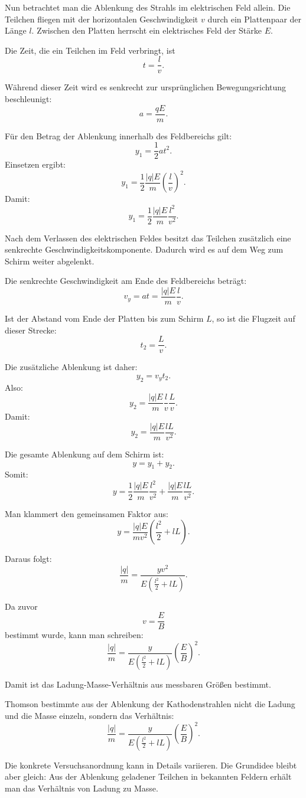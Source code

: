 Nun betrachtet man die Ablenkung des Strahls im elektrischen Feld allein. Die Teilchen
fliegen mit der horizontalen Geschwindigkeit \(v\) durch ein Plattenpaar der Länge
\(l\). Zwischen den Platten herrscht ein elektrisches Feld der Stärke \(E\).

Die Zeit, die ein Teilchen im Feld verbringt, ist
\[
t = \frac{l}{v}.
\]

Während dieser Zeit wird es senkrecht zur ursprünglichen Bewegungsrichtung beschleunigt:
\[
a = \frac{qE}{m}.
\]

Für den Betrag der Ablenkung innerhalb des Feldbereichs gilt:
\[
y_1 = \frac{1}{2} a t^2.
\]
Einsetzen ergibt:
\[
y_1
=
\frac{1}{2}
\frac{|q|E}{m}
\left(\frac{l}{v}\right)^2.
\]
Damit:
\[
y_1
=
\frac{1}{2}
\frac{|q|E}{m}
\frac{l^2}{v^2}.
\]

Nach dem Verlassen des elektrischen Feldes besitzt das Teilchen zusätzlich eine
senkrechte Geschwindigkeitskomponente. Dadurch wird es auf dem Weg zum Schirm weiter
abgelenkt.

Die senkrechte Geschwindigkeit am Ende des Feldbereichs beträgt:
\[
v_y = at
=
\frac{|q|E}{m}\frac{l}{v}.
\]

Ist der Abstand vom Ende der Platten bis zum Schirm \(L\), so ist die Flugzeit auf
dieser Strecke:
\[
t_2 = \frac{L}{v}.
\]

Die zusätzliche Ablenkung ist daher:
\[
y_2 = v_y t_2.
\]
Also:
\[
y_2
=
\frac{|q|E}{m}
\frac{l}{v}
\frac{L}{v}.
\]
Damit:
\[
y_2
=
\frac{|q|E}{m}
\frac{lL}{v^2}.
\]

Die gesamte Ablenkung auf dem Schirm ist:
\[
y = y_1 + y_2.
\]
Somit:
\[
y
=
\frac{1}{2}
\frac{|q|E}{m}
\frac{l^2}{v^2}
+
\frac{|q|E}{m}
\frac{lL}{v^2}.
\]

Man klammert den gemeinsamen Faktor aus:
\[
y
=
\frac{|q|E}{m v^2}
\left(
\frac{l^2}{2} + lL
\right).
\]

Daraus folgt:
\[
\frac{|q|}{m}
=
\frac{y v^2}
{
	E\left(\frac{l^2}{2} + lL\right)
}.
\]

Da zuvor
\[
v = \frac{E}{B}
\]
bestimmt wurde, kann man schreiben:
\[
\frac{|q|}{m}
=
\frac{y}{E\left(\frac{l^2}{2} + lL\right)}
\left(\frac{E}{B}\right)^2.
\]

Damit ist das Ladung-Masse-Verhältnis aus messbaren Größen bestimmt.

\begin{MathBox}
	\label{box:thomson-ladung-masse-verhaeltnis}
	Thomson bestimmte aus der Ablenkung der Kathodenstrahlen nicht die Ladung und
	die Masse einzeln, sondern das Verhältnis:
	\[
	\frac{|q|}{m}
	=
	\frac{y}{E\left(\frac{l^2}{2} + lL\right)}
	\left(\frac{E}{B}\right)^2.
	\]
	
	Die konkrete Versuchsanordnung kann in Details variieren. Die Grundidee bleibt
	aber gleich: Aus der Ablenkung geladener Teilchen in bekannten Feldern erhält man
	das Verhältnis von Ladung zu Masse.
\end{MathBox}

